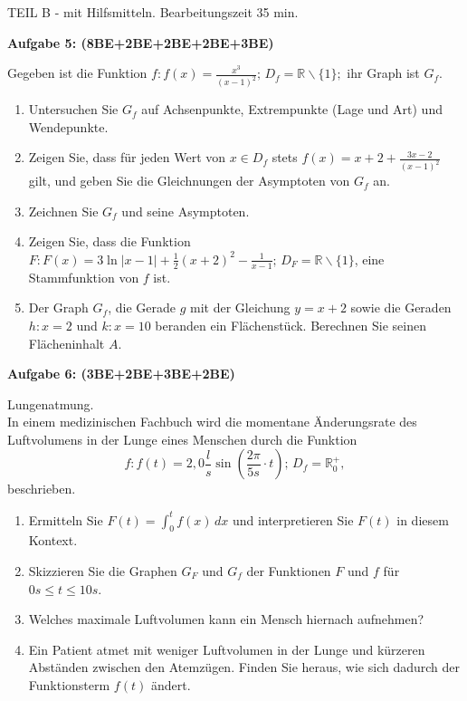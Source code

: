 \documentclass[a4paper,12pt]{article}
\newcommand{\Aufgabe}[1]{
  {
  \vspace*{0.5cm}
  \textsf{\textbf{Aufgabe #1}}
  \vspace*{0.2cm}
  
  }
}
\begin{document}
\newpage
\vspace{1,5cm} {TEIL B} - mit Hilfsmitteln. Bearbeitungszeit 35 min.
\vspace {0,2cm}

\Aufgabe{5: (8BE+2BE+2BE+2BE+3BE)}
Gegeben ist die Funktion $f: f(x) = \frac{x^3}{(x-1)^2};\, D_f=\mathbb{R}\backslash\{1\};$ ihr Graph ist $G_f$.
\begin{enumerate}[label={\alph*)}]
  \item Untersuchen Sie $G_f$ auf Achsenpunkte, Extrempunkte (Lage und Art) und Wendepunkte.
  \item Zeigen Sie, dass für jeden Wert von $x\in D_f$ stets $f(x) = x+2+\frac{3x-2}{(x-1)^2}$ gilt, und geben Sie die Gleichnungen der Asymptoten von $G_f$ an.
  \item Zeichnen Sie $G_f$ und seine Asymptoten.
  \item Zeigen Sie, dass die Funktion $F: F(x) = 3 \ln |x-1| + \frac{1}{2}(x+2)^2 - \frac{1}{x-1};\, D_F=\mathbb{R}\backslash\{1\}$, eine Stammfunktion von $f$ ist.
  \item Der Graph $G_f$, die Gerade $g$ mit der Gleichung $y=x+2$ sowie die Geraden $h: x=2$ und $k: x=10$ beranden ein Flächenstück. Berechnen Sie seinen Flächeninhalt $A$.
\end{enumerate}

\Aufgabe{6: (3BE+2BE+3BE+2BE)}
Lungenatmung.\\
In einem medizinischen Fachbuch wird die momentane Änderungsrate des Luftvolumens in der Lunge eines Menschen durch die Funktion
\[f:f(t) = 2,0\frac{l}{s}\sin (\frac{2\pi}{5s}\cdot t);\, D_f=\mathbb{R}_0^+,\] beschrieben.
\begin{enumerate}[label={\alph*)}]
  \item Ermitteln Sie $F(t)=\int_0^t f(x)\, dx$ und interpretieren Sie $F(t)$ in diesem Kontext.
  \item Skizzieren Sie die Graphen $G_F$ und $G_f$ der Funktionen $F$ und $f$ für $0 s \le t \le 10 s$.
  \item Welches maximale Luftvolumen kann ein Mensch hiernach aufnehmen?
  \item Ein Patient atmet mit weniger Luftvolumen in der Lunge und kürzeren Abständen zwischen den Atemzügen. Finden Sie heraus, wie sich dadurch der Funktionsterm $f(t)$ ändert.
\end{enumerate}
\end{document}
